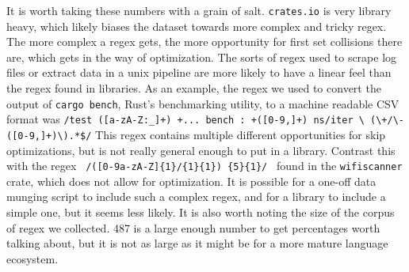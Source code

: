 It is worth taking these numbers with a grain of salt. \verb'crates.io'
is very library heavy, which likely biases the dataset towards
more complex and tricky regex. The more complex a regex gets,
the more opportunity for first set collisions there are, which gets
in the way of optimization. The sorts
of regex used to scrape log files or extract data in a unix pipeline
are more likely to have a linear feel than the regex found in
libraries. As an example, the regex we used to convert the output
of \texttt{cargo \allowbreak bench}, Rust's benchmarking utility, to a machine
readable CSV format was
\texttt{/test \allowbreak([a-zA-Z:\_]+) \allowbreak +... bench\allowbreak
      : \allowbreak+([0-9,]+) \allowbreak ns/iter \textbackslash
      (\textbackslash+/\textbackslash- \allowbreak
      ([0-9,]+)\textbackslash).*\$/}
This regex contains multiple different opportunities for skip optimizations,
but is not really general enough to put in a library. Contrast this
with the regex
\texttt{
/([0-9a-zA-Z]\allowbreak\{1\}\allowbreak/\allowbreak
[0-9a-zA-Z]\{1\}\allowbreak[:]\allowbreak\{1\})
\{5\}\allowbreak[0-9a-zA-Z]\allowbreak[0-9a-zA-Z]
\allowbreak\{1\}/
}
found in the \verb'wifiscanner' crate, which does not allow for
optimization. It is possible for a one-off data munging script to include
such a complex regex, and for a library to include a simple one, but
it seems less likely. It is also worth noting the size of the corpus of
regex we collected. 487 is a large enough number to get 
percentages worth talking about, but it is not as large as it might
be for a more mature language ecosystem.

